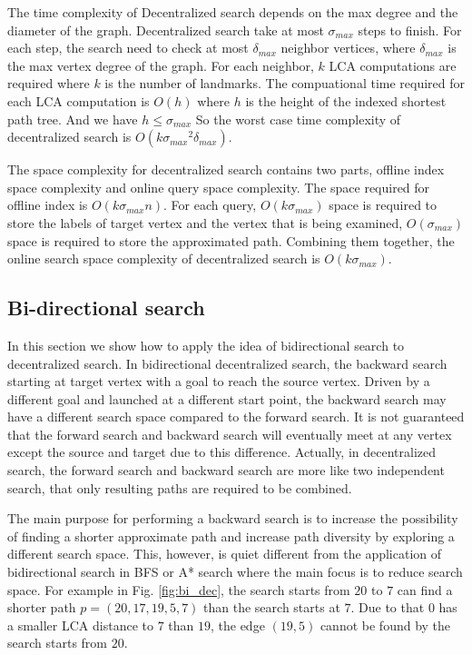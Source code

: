 The time complexity of Decentralized search depends on the max degree and the diameter of the graph. Decentralized search take at most ${\sigma}_{max}$ steps to finish. For each step, the search need to check at most ${\delta}_{max}$ neighbor vertices, where ${\delta}_{max}$ is the max vertex degree of the graph. For each neighbor, $k$ LCA computations are required where $k$ is the number of landmarks. The compuational time required for each LCA computation is $O(h)$ where $h$ is the height of the indexed shortest path tree. And we have $h \leq {\sigma}_{max}$ So the worst case time complexity of decentralized search is $O(k{{\sigma}_{max}}^2{\delta}_{max})$. 

The space complexity for decentralized search contains two parts, offline index space complexity and online query space complexity. The space required for offline index is $O(k{\sigma}_{max}n)$. For each query, $O(k{\sigma}_{max})$ space is required to store the labels of target vertex and the vertex that is being examined, $O({\sigma}_{max})$ space is required to store the approximated path. Combining them together, the online search space complexity of decentralized search is $O(k{\sigma}_{max})$.

\subsection{Bi-directional search}

In this section we show how to apply the idea of bidirectional search to decentralized search. In bidirectional decentralized search, the backward search starting at target vertex with a goal to reach the source vertex. Driven by a different goal and launched at a different start point, the backward search may have a different search space compared to the forward search. It is not guaranteed that the forward search and backward search will eventually meet at any vertex except the source and target due to this difference. Actually, in decentralized search, the forward search and backward search are more like two independent search, that only resulting paths are required to be combined.

The main purpose for performing a backward search is to increase the possibility of finding a shorter approximate path and increase path diversity by exploring a different search space. This, however, is quiet different from the application of bidirectional search in BFS or A* search where the main focus is to reduce search space. For example in Fig. \ref{fig:bi_dec}, the search starts from $20$ to $7$ can find a shorter path $p = (20, 17, 19, 5, 7)$ than the search starts at $7$. Due to that $0$ has a smaller LCA distance to $7$ than $19$, the edge $(19, 5)$ cannot be found by the search starts from $20$. 

